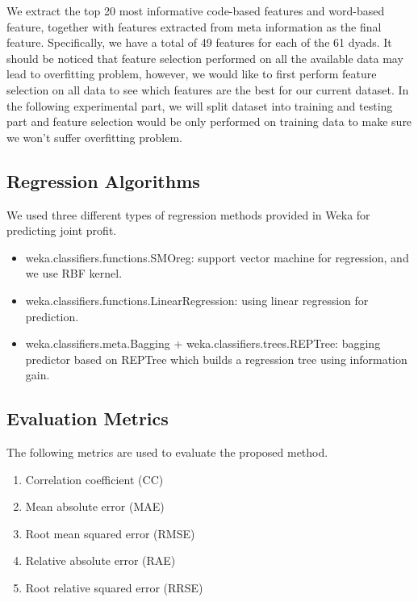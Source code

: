 \documentclass[11pt]{article} %
\begin{document}
We extract the top 20 most informative code-based features and word-based feature, together with features extracted from meta information as the final feature. Specifically, we have a total of 49 features for each of the 61 dyads. It should be noticed that feature selection performed on all the available data may lead to overfitting problem, however, we would like to first perform feature selection on all data to see which features are the best for our current dataset. In the following experimental part, we will split dataset into training and testing part and feature selection would be only performed on training data to make sure we won't suffer overfitting problem.

\subsection{Regression Algorithms}
We used three different types of regression methods provided in Weka for predicting joint profit.
\begin{itemize}
\item weka.classifiers.functions.SMOreg: support vector machine for regression, and we use RBF kernel. \cite{SVM} \cite{SMO}
\item weka.classifiers.functions.LinearRegression: using linear regression for prediction.
\item weka.classifiers.meta.Bagging + weka.classifiers.trees.REPTree: bagging predictor based on REPTree which builds a regression tree using information gain. \cite{bagging}
\end{itemize}

\subsection{Evaluation Metrics}
The following metrics are used to evaluate the proposed method.

\begin{enumerate}
\item Correlation coefficient (CC)

\item Mean absolute error (MAE)

\item Root mean squared error (RMSE)

\item Relative absolute error (RAE)

\item Root relative squared error (RRSE)
\end{enumerate}
\end{document}
